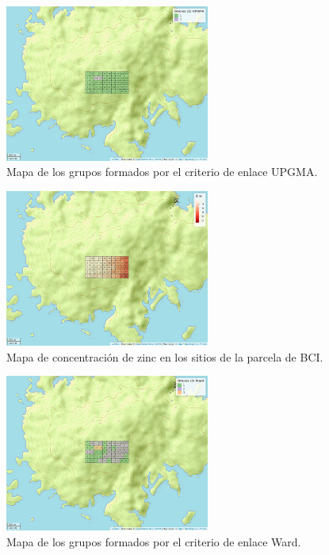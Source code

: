 \documentclass[11pt,]{article}
\begin{document}
\begin{figure}
\centering
\includegraphics[width=0.60000\textwidth]{mapa_upgma_k2.png}
\caption{Mapa de los grupos formados por el criterio de enlace UPGMA.
\label{fig:gruposU}}
\end{figure}

\begin{figure}
\centering
\includegraphics[width=0.60000\textwidth]{mapa_zinc.png}
\caption{Mapa de concentración de zinc en los sitios de la parcela de
BCI.\label{fig:zinc}}
\end{figure}

\begin{figure}
\centering
\includegraphics[width=0.60000\textwidth]{mapa_ward_k3.png}
\caption{Mapa de los grupos formados por el criterio de enlace Ward.
\label{fig:gruposW}}
\end{figure}
\end{document}

